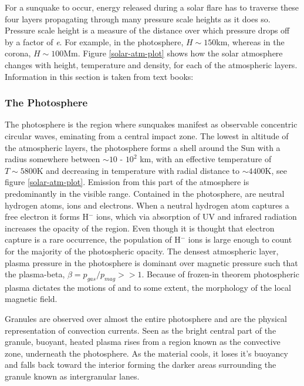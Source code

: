 For a sunquake to occur, energy released during a solar flare has to traverse these four layers propagating through many pressure scale heights as it does so. Pressure scale height is a measure of the distance over which pressure drops off by a factor of \emph{e}. For example, in the photosphere, $H\sim150$km, whereas in the corona, $H\sim100$Mm. Figure \ref{solar-atm-plot} shows how the solar atmosphere changes with height, temperature and density, for each of the atmospheric layers. Information in this section is taken from text books: \cite{2003dysu.book.....D, 2004soas.book.....F}


\subsubsection{The Photosphere}
The photosphere is the region where sunquakes manifest as observable concentric circular waves, eminating from a central impact zone. The lowest in altitude of the atmospheric layers, the photosphere forms a shell around the Sun with a radius somewhere between $\sim10$ - $10^{2}$ km, with an effective temperature of $T\sim5800$K and decreasing in temperature with radial distance to $\sim4400$K, see figure \ref{solar-atm-plot}. Emission from this part of the atmosphere is predominantly in the visible range. Contained in the photosphere, are neutral hydrogen atoms, ions and electrons. When a neutral hydrogen atom captures a free electron it forms H$^{-}$ ions, which via absorption of UV and infrared radiation increases the opacity of the region. Even though it is thought that electron capture is a rare occurrence, the population of H$^{-}$ ions is large enough to count for the majority of the photospheric opacity. The densest atmospheric layer, plasma pressure in the photosphere is dominant over magnetic pressure such that the plasma-beta, $\beta = p_{gas}/p_{mag} >> 1$. Because of frozen-in theorem photospheric plasma dictates the motions of and to some extent, the morphology of the local magnetic field.

Granules are observed over almost the entire photosphere and are the physical representation of convection currents. Seen as the bright central part of the granule, buoyant, heated plasma rises from a region known as the convective zone, underneath the photosphere. As the material cools, it loses it's buoyancy and falls back toward the interior forming the darker areas surrounding the granule known as intergranular lanes.

